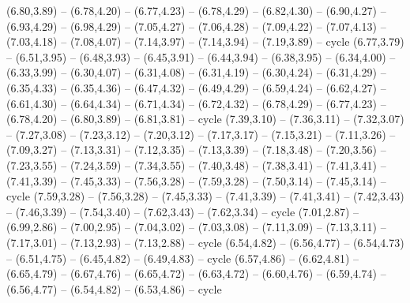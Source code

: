 \expandafter\def\csname geo:gebiet:EGY\endcsname{
  (6.80,3.89) -- (6.78,4.20) -- (6.77,4.23) -- (6.78,4.29) -- (6.82,4.30) -- (6.90,4.27) -- (6.93,4.29) -- (6.98,4.29) -- (7.05,4.27) -- (7.06,4.28) -- (7.09,4.22) -- (7.07,4.13) -- (7.03,4.18) -- (7.08,4.07) -- (7.14,3.97) -- (7.14,3.94) -- (7.19,3.89) -- cycle}
\expandafter\def\csname geo:gebiet:LBY\endcsname{
  (6.77,3.79) -- (6.51,3.95) -- (6.48,3.93) -- (6.45,3.91) -- (6.44,3.94) -- (6.38,3.95) -- (6.34,4.00) -- (6.33,3.99) -- (6.30,4.07) -- (6.31,4.08) -- (6.31,4.19) -- (6.30,4.24) -- (6.31,4.29) -- (6.35,4.33) -- (6.35,4.36) -- (6.47,4.32) -- (6.49,4.29) -- (6.59,4.24) -- (6.62,4.27) -- (6.61,4.30) -- (6.64,4.34) -- (6.71,4.34) -- (6.72,4.32) -- (6.78,4.29) -- (6.77,4.23) -- (6.78,4.20) -- (6.80,3.89) -- (6.81,3.81) -- cycle}
\expandafter\def\csname geo:gebiet:ETH\endcsname{
  (7.39,3.10) -- (7.36,3.11) -- (7.32,3.07) -- (7.27,3.08) -- (7.23,3.12) -- (7.20,3.12) -- (7.17,3.17) -- (7.15,3.21) -- (7.11,3.26) -- (7.09,3.27) -- (7.13,3.31) -- (7.12,3.35) -- (7.13,3.39) -- (7.18,3.48) -- (7.20,3.56) -- (7.23,3.55) -- (7.24,3.59) -- (7.34,3.55) -- (7.40,3.48) -- (7.38,3.41) -- (7.41,3.41) -- (7.41,3.39) -- (7.45,3.33) -- (7.56,3.28) -- (7.59,3.28) -- (7.50,3.14) -- (7.45,3.14) -- cycle}
\expandafter\def\csname geo:gebiet:DJI\endcsname{
  }
\expandafter\def\csname geo:gebiet:SOL\endcsname{
  (7.59,3.28) -- (7.56,3.28) -- (7.45,3.33) -- (7.41,3.39) -- (7.41,3.41) -- (7.42,3.43) -- (7.46,3.39) -- (7.54,3.40) -- (7.62,3.43) -- (7.62,3.34) -- cycle}
\expandafter\def\csname geo:gebiet:UGA\endcsname{
  (7.01,2.87) -- (6.99,2.86) -- (7.00,2.95) -- (7.04,3.02) -- (7.03,3.08) -- (7.11,3.09) -- (7.13,3.11) -- (7.17,3.01) -- (7.13,2.93) -- (7.13,2.88) -- cycle}
\expandafter\def\csname geo:gebiet:RWA\endcsname{
  }
\expandafter\def\csname geo:gebiet:BIH\endcsname{
  (6.54,4.82) -- (6.56,4.77) -- (6.54,4.73) -- (6.51,4.75) -- (6.45,4.82) -- (6.49,4.83) -- cycle}
\expandafter\def\csname geo:gebiet:MKD\endcsname{
  }
\expandafter\def\csname geo:gebiet:SRB\endcsname{
  (6.57,4.86) -- (6.62,4.81) -- (6.65,4.79) -- (6.67,4.76) -- (6.65,4.72) -- (6.63,4.72) -- (6.60,4.76) -- (6.59,4.74) -- (6.56,4.77) -- (6.54,4.82) -- (6.53,4.86) -- cycle}
\expandafter\def\csname geo:gebiet:MNE\endcsname{
  }
\expandafter\def\csname geo:gebiet:KOS\endcsname{
  }
\expandafter\def\csname geo:gebiet:TTO\endcsname{
  }
